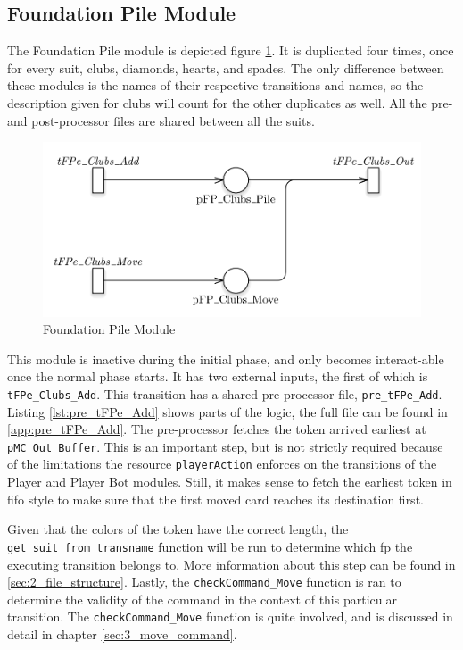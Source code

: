 \documentclass[runningheads,a4paper]{llncs}
\newcommand{\GPenSIM}{../GPenSIM}
\begin{document}
\subsection{Foundation Pile Module}
The Foundation Pile module is depicted figure \ref{fig:foundation_pile}. It is duplicated four times, once for every suit, clubs, diamonds, hearts, and spades. The only difference between these modules is the names of their respective transitions and names, so the description given for clubs will count for the other duplicates as well. All the pre- and post-processor files are shared between all the suits.
\newline
\begin{figure}
	\begin{center}
		\includegraphics[width=\textwidth]{images/foundationPile}
		\caption{Foundation Pile Module}
		\label{fig:foundation_pile}
	\end{center}
\end{figure}

This module is inactive during the initial phase, and only becomes interact-able once the normal phase starts. It has two external inputs, the first of which is \verb!tFPe_Clubs_Add!. This transition has a shared pre-processor file, \verb!pre_tFPe_Add!. Listing \ref{lst:pre_tFPe_Add} shows parts of the logic, the full file can be found in \ref{app:pre_tFPe_Add}. The pre-processor fetches the token arrived earliest at \verb!pMC_Out_Buffer!. This is an important step, but is not strictly required because of the limitations the resource \verb!playerAction! enforces on the transitions of the Player and Player Bot modules. Still, it makes sense to fetch the earliest token in \ac{fifo} style to make sure that the first moved card reaches its destination first. 
\newline

Given that the colors of the token have the correct length, the \verb!get_suit_from_transname! function will be run to determine which \ac{fp} the executing transition belongs to. More information about this step can be found in \ref{sec:2_file_structure}. Lastly, the \verb!checkCommand_Move! function is ran to determine the validity of the command in the context of this particular transition. The \verb!checkCommand_Move! function is quite involved, and is discussed in detail in chapter \ref{sec:3_move_command}.

\end{document}

